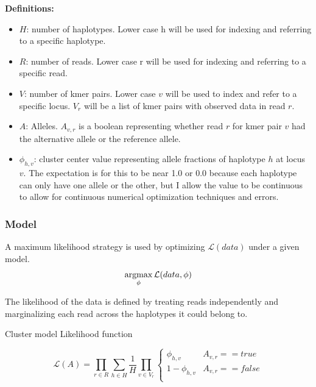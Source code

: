 \textbf{Definitions:}
\begin{itemize}
\item $H$: number of haplotypes. Lower case h will be used for indexing and referring to a specific haplotype.
\item $R$: number of reads. Lower case r will be used for indexing and referring to a specific read. 
\item $V$: number of kmer pairs. Lower case $v$ will be used to index and refer to a specific locus. $V_r$ will be a list of kmer pairs with observed data in read $r$.
\item $A$: Alleles. $A_{v,r}$ is a boolean representing whether read $r$ for kmer pair $v$ had the alternative allele or the reference allele.
\item $\phi_{h,v}$: cluster center value representing allele fractions of haplotype $h$ at locus $v$. The expectation is for this to be near 1.0 or 0.0 because each haplotype can only have one allele or the other, but I allow the value to be continuous to allow for continuous numerical optimization techniques and errors.
\end{itemize}

\noindent
\subsubsection{Model}

A maximum likelihood strategy is used by optimizing $\mathcal{L}(data)$ under a given model. 
\begin{equation}
\operatorname*{argmax}_{\phi} \mathcal{L}(data, \phi)
\end{equation}


The likelihood of the data is defined by treating reads independently and marginalizing each read across the haplotypes it could belong to. 

Cluster model Likelihood function

\begin{equation}
\mathcal{L}(A) = \prod_{r \in R} \sum_{h \in H} \frac{1}{H} \prod_{v \in V_r} \begin{cases}       \phi_{h,v} & A_{v,r} == true \\      1 - \phi_{h,v} & A_{v,r} == false \\
\end{cases}
\end{equation}

